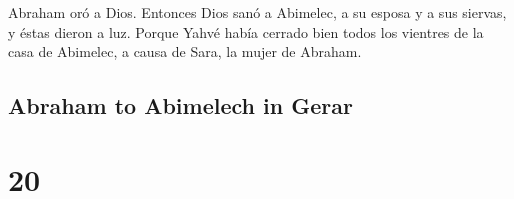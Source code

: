 \begin{paracol}{2}
 Abraham oró a Dios. Entonces Dios sanó a Abimelec, a su
esposa y a sus siervas, y éstas dieron a luz.  Porque
Yahvé había cerrado bien todos los vientres de la casa de Abimelec, a
causa de Sara, la mujer de Abraham.

\switchcolumn
\begin{otherlanguage}{english}

\hypertarget{abraham-to-abimelech-in-gerar}{%
\subsection{Abraham to Abimelech in
Gerar}\label{abraham-to-abimelech-in-gerar}}

\hypertarget{section-39}{%
\section{20}\label{section-39}}


\end{otherlanguage}
\end{paracol}
